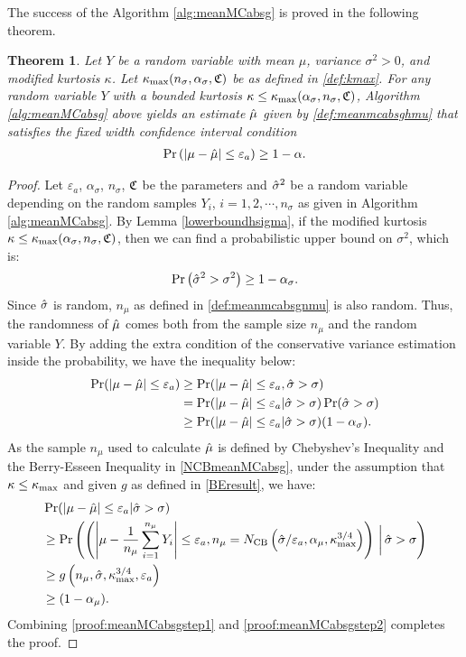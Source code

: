 \documentclass{iitthesis}
\newtheorem{theorem}{Theorem}[section]
\theoremstyle{definition}
\begin{document}
The success of the Algorithm \ref{alg:meanMCabsg} is proved in the following theorem.
\begin{theorem} \cite[Theorem 5]{HJLO12}\label{thm:meanMCabsg}
Let $Y$ be a random variable with mean $\mu$, variance $\sigma^2 >0$, and modified kurtosis $\kappa$. Let $\kappa_{\max}(n_\sigma,\alpha_\sigma,\mathfrak{C})$ be as defined in \eqref{def:kmax}. For any random variable $Y$ with a bounded kurtosis $\kappa\leq\kappa_{\max}(\alpha_{\sigma},n_{\sigma},\mathfrak{C})$, Algorithm \ref{alg:meanMCabsg} above yields an estimate $\hat{\mu}$ given by \eqref{def:meanmcabsghmu} that satisfies the fixed width confidence interval condition
\begin{align}
\Pr\left( \left \lvert \mu-\hat{\mu} \right \rvert \leq \varepsilon_a \right) \geq 1-\alpha.
\end{align}
\end{theorem}
\begin{proof}
Let $\varepsilon_a$, $\alpha_\sigma$, $n_\sigma$, $\mathfrak{C}$ be the parameters and $\hat{\sigma}^2$ be a random variable depending on the random samples $Y_i$, $i = 1,2,\cdots, n_{\sigma}$ as given in Algorithm \ref{alg:meanMCabsg}. By Lemma \ref{lowerboundhsigma}, if the modified kurtosis $\kappa \leq \kappa_{\max}(\alpha_{\sigma},n_{\sigma},\mathfrak{C})$, then we can find a probabilistic upper bound on $\sigma^2$, which is:
$$\Pr \left(\hat{\sigma}^2 > \sigma^2\right)\geq 1-\alpha_{\sigma}.$$
Since $\hat{\sigma}$ is random, $n_\mu$ as defined in \eqref{def:meanmcabsgnmu} is also random. Thus, the randomness of $\hat{\mu}$ comes both from the sample size $n_\mu$ and the random variable $Y$. By adding the extra condition of the conservative variance estimation inside the probability, we have the inequality below:
\begin{align}
\Pr(\left \lvert \mu-\hat{\mu} \right \rvert \leq \varepsilon_a) &\geq  \Pr({\left \lvert \mu-\hat{\mu} \right \rvert \leq \varepsilon_a}, {\hat{\sigma} >\sigma}) \nonumber \\
&= \Pr(\left \lvert \mu-\hat{\mu} \right \rvert \leq \varepsilon_a |\hat{\sigma}>\sigma)\Pr(\hat{\sigma} >\sigma) \nonumber \\
&\geq \Pr(\left \lvert \mu-\hat{\mu} \right \rvert \leq \varepsilon_a |\hat{\sigma} > \sigma)(1-\alpha_\sigma)\label{proof:meanMCabsgstep1}.
\end{align}
As the sample $n_\mu$ used to calculate $\hat{\mu}$ is defined by Chebyshev's Inequality and the Berry-Esseen Inequality in \eqref{NCBmeanMCabsg}, under the assumption that $\kappa \leq \kappa_{\max}$ and given $g$ as defined in \eqref{BEresult}, we have:
\begin{align}
&\Pr(\left \lvert \mu-\hat{\mu} \right \rvert \leq \varepsilon_a|\hat{\sigma}>\sigma) \nonumber \\& \geq \Pr\left( \left({\left \lvert \mu-\frac{1}{n_\mu}\sum_{i=1}^{n_\mu} Y_i \right \rvert \leq \varepsilon_a},{n_\mu= N_{\text{CB}}\left(\hat{\sigma}/\varepsilon_a,\alpha_\mu, \kappa_{\max}^{3/4}\right)}\right)\,\bigg\vert \,\hat{\sigma}>\sigma\right) \nonumber \\&\geq g\left(n_\mu,\hat{\sigma}, \kappa_{\max}^{3/4}, \varepsilon_a\right) \nonumber  \\&\geq (1-\alpha_\mu) \label{proof:meanMCabsgstep2}.
\end{align}
Combining \eqref{proof:meanMCabsgstep1} and \eqref{proof:meanMCabsgstep2} completes the proof.
\end{proof}
\end{document}
